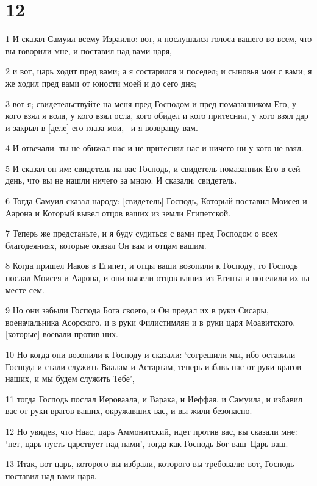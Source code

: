 \chapter{12}

\par 1 И сказал Самуил всему Израилю: вот, я послушался голоса вашего во всем, что вы говорили мне, и поставил над вами царя,
\par 2 и вот, царь ходит пред вами; а я состарился и поседел; и сыновья мои с вами; я же ходил пред вами от юности моей и до сего дня;
\par 3 вот я; свидетельствуйте на меня пред Господом и пред помазанником Его, у кого взял я вола, у кого взял осла, кого обидел и кого притеснил, у кого взял дар и закрыл в [деле] его глаза мои, --и я возвращу вам.
\par 4 И отвечали: ты не обижал нас и не притеснял нас и ничего ни у кого не взял.
\par 5 И сказал он им: свидетель на вас Господь, и свидетель помазанник Его в сей день, что вы не нашли ничего за мною. И сказали: свидетель.
\par 6 Тогда Самуил сказал народу: [свидетель] Господь, Который поставил Моисея и Аарона и Который вывел отцов ваших из земли Египетской.
\par 7 Теперь же предстаньте, и я буду судиться с вами пред Господом о всех благодеяниях, которые оказал Он вам и отцам вашим.
\par 8 Когда пришел Иаков в Египет, и отцы ваши возопили к Господу, то Господь послал Моисея и Аарона, и они вывели отцов ваших из Египта и поселили их на месте сем.
\par 9 Но они забыли Господа Бога своего, и Он предал их в руки Сисары, военачальника Асорского, и в руки Филистимлян и в руки царя Моавитского, [которые] воевали против них.
\par 10 Но когда они возопили к Господу и сказали: `согрешили мы, ибо оставили Господа и стали служить Ваалам и Астартам, теперь избавь нас от руки врагов наших, и мы будем служить Тебе',
\par 11 тогда Господь послал Иероваала, и Варака, и Иеффая, и Самуила, и избавил вас от руки врагов ваших, окружавших вас, и вы жили безопасно.
\par 12 Но увидев, что Наас, царь Аммонитский, идет против вас, вы сказали мне: `нет, царь пусть царствует над нами', тогда как Господь Бог ваш--Царь ваш.
\par 13 Итак, вот царь, которого вы избрали, которого вы требовали: вот, Господь поставил над вами царя.
